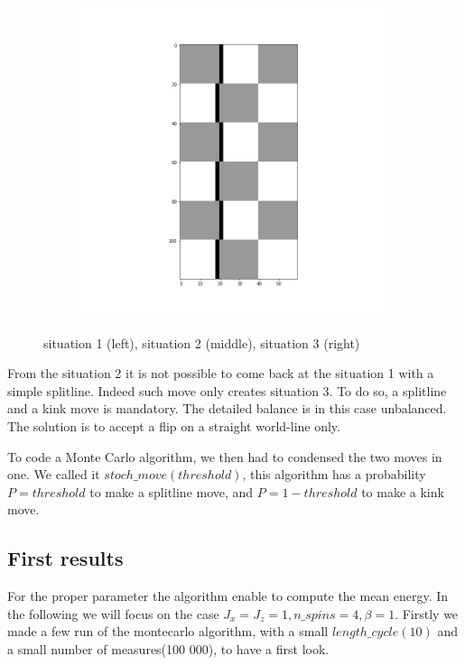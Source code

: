 \documentclass[a4paper,12pt,twoside]{article}
\begin{document}
\begin{figure}[!h]
\begin{subfigure}[b]{0.3\textwidth}
	 	\end{subfigure}
	 	\begin{subfigure}[b]{0.3\textwidth}
	 		\includegraphics[scale=0.2]{situation3.png}
	 	\end{subfigure}
	 	\caption{situation 1 (left), situation 2 (middle), situation 3 (right)}
	 	\label{flawed detailed balance}			
	 \end{figure}
	 
	 From the situation 2 it is not possible to come back at the situation 1 with a simple splitline. Indeed such move only creates situation 3. To do so, a splitline and a kink move is mandatory. The detailed balance is in this case unbalanced. The solution is to accept a flip on a straight world-line only.
	 
	 To code a Monte Carlo algorithm, we then had to condensed the two moves in one. We called it $stoch\_move(threshold)$, this algorithm has a probability $P = threshold$ to make a splitline move, and $P = 1-threshold$ to make a kink move.
	 
	 \subsection{First results}
	 For the proper parameter the algorithm enable to compute the mean energy. In the following we will focus on the case $J_x = J_z =1, n\_spins = 4, \beta = 1$.
	 Firstly we made a few run of the montecarlo algorithm, with a small $length\_cycle (10)$ and a small number of measures(100 000), to have a first look.
	 
\end{document}
